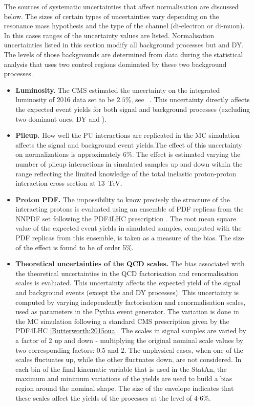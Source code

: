 The sources of systematic uncertainties that affect normalisation are discussed below. The sizes of certain types of uncertainties vary depending on the resonance mass hypothesis and the type of the channel (di-electron or di-muon). In this cases ranges of the uncertainty values are listed. Normalisation uncertainties listed in this section modify all background processes but \ttbar and DY. The levels of those backgrounds are determined from data during the statistical analysis that uses two control regions dominated by these two background processes.
  
\begin{itemize}

\item{\bf Luminosity.} 
The CMS estimated the uncertainty on the integrated luminosity of 2016 data set to be $2.5\%$, see ~\cite{CMS-PAS-LUM-17-001}. This uncertainty directly affects the expected event yields for both signal and background processes (excluding two dominant ones, DY and \ttbar).
  
\item{\bf Pileup.} 
How well the PU interactions are replicated in the MC simulation affects the signal and background event yields.The effect of this uncertainty on normalizations is approximately 6\%. The effect is estimated varying the number of pileup interactions in simulated samples up and down within the range reflecting the limited knowledge of the total inelastic proton-proton interaction cross section at 13~TeV. 

\item{\bf Proton PDF.} 
The impossibility to know precisely the structure of the interacting protons is evaluated using an ensemble of PDF replicas from the NNPDF set \cite{Ball:2014uwa} following the PDF4LHC prescription \cite{Botje:2011sn,Alekhin:2011sk}. The root mean square value of the expected event yields in simulated samples, computed with the PDF replicas from this ensemble, is taken as a measure of the bias. The size of the effect is found to be of order 5\%. 
  
\item{\bf Theoretical uncertainties of the QCD scales.} 
The bias associated with the theoretical uncertainties in the QCD factorisation and renormalisation scales is evaluated. This uncertainty affects the expected yield of the signal and background events (except the \ttbar and DY processes). This uncertainty is computed by varying independently factorisation and renormalisation scales, used as parameters in the Pythia event generator. The variation is done in the MC simulation following a standard CMS prescription given by the PDF4LHC \ref{Butterworth:2015oua}. The scales in signal samples are varied by a factor of 2 up and down - multiplying the original nominal scale values by two corresponding factors: 0.5 and 2. The unphysical cases, when one of the scales fluctuates up, while the other fluctuates down, are not considered. In each bin of the final kinematic variable that is used in the StatAn, the maximum and minimum variations of the yields are used to build a bias region around the nominal shape. The size of the envelope indicates that these scales affect the yields of the processes at the level of 4-6\%.


\end{itemize}
